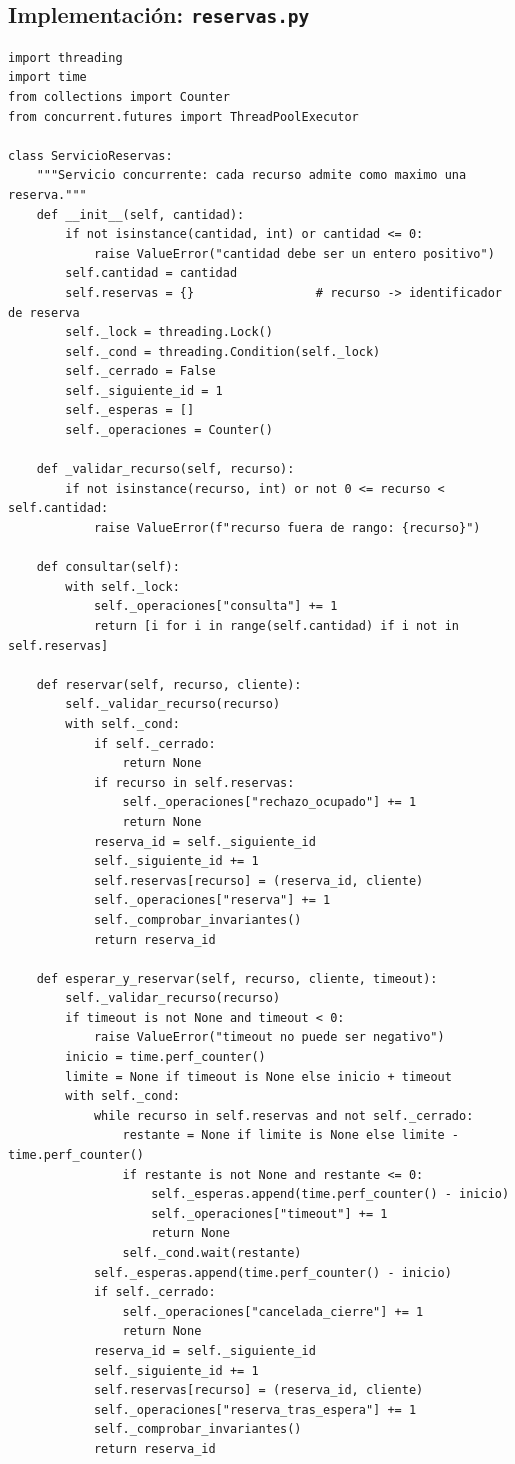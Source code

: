 \documentclass[12pt,a4paper]{article}
\begin{document}
\subsection{Implementación: \texttt{reservas.py}}
\begin{lstlisting}[style=pycode]
import threading
import time
from collections import Counter
from concurrent.futures import ThreadPoolExecutor

class ServicioReservas:
    """Servicio concurrente: cada recurso admite como maximo una reserva."""
    def __init__(self, cantidad):
        if not isinstance(cantidad, int) or cantidad <= 0:
            raise ValueError("cantidad debe ser un entero positivo")
        self.cantidad = cantidad
        self.reservas = {}                 # recurso -> identificador de reserva
        self._lock = threading.Lock()
        self._cond = threading.Condition(self._lock)
        self._cerrado = False
        self._siguiente_id = 1
        self._esperas = []
        self._operaciones = Counter()

    def _validar_recurso(self, recurso):
        if not isinstance(recurso, int) or not 0 <= recurso < self.cantidad:
            raise ValueError(f"recurso fuera de rango: {recurso}")

    def consultar(self):
        with self._lock:
            self._operaciones["consulta"] += 1
            return [i for i in range(self.cantidad) if i not in self.reservas]

    def reservar(self, recurso, cliente):
        self._validar_recurso(recurso)
        with self._cond:
            if self._cerrado:
                return None
            if recurso in self.reservas:
                self._operaciones["rechazo_ocupado"] += 1
                return None
            reserva_id = self._siguiente_id
            self._siguiente_id += 1
            self.reservas[recurso] = (reserva_id, cliente)
            self._operaciones["reserva"] += 1
            self._comprobar_invariantes()
            return reserva_id

    def esperar_y_reservar(self, recurso, cliente, timeout):
        self._validar_recurso(recurso)
        if timeout is not None and timeout < 0:
            raise ValueError("timeout no puede ser negativo")
        inicio = time.perf_counter()
        limite = None if timeout is None else inicio + timeout
        with self._cond:
            while recurso in self.reservas and not self._cerrado:
                restante = None if limite is None else limite - time.perf_counter()
                if restante is not None and restante <= 0:
                    self._esperas.append(time.perf_counter() - inicio)
                    self._operaciones["timeout"] += 1
                    return None
                self._cond.wait(restante)
            self._esperas.append(time.perf_counter() - inicio)
            if self._cerrado:
                self._operaciones["cancelada_cierre"] += 1
                return None
            reserva_id = self._siguiente_id
            self._siguiente_id += 1
            self.reservas[recurso] = (reserva_id, cliente)
            self._operaciones["reserva_tras_espera"] += 1
            self._comprobar_invariantes()
            return reserva_id


\end{lstlisting}
\end{document}
